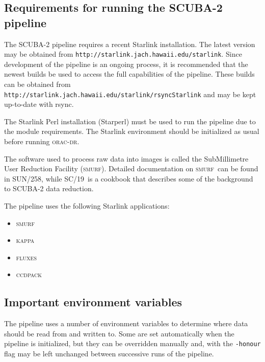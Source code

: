 \documentclass[twoside,11pt]{article}
\newcommand{\htmladdnormallink}[2]{#1}
\newcommand{\xref}[3]{#1}
\renewcommand{\_}{\texttt{\symbol{95}}}
\newcommand{\CCDPACK}{\textsc{ccdpack}}
\newcommand{\FLUXES}{\textsc{fluxes}}
\newcommand{\KAPPA}{\textsc{kappa}}
\newcommand{\SMURF}{\textsc{smurf}}
\newcommand{\SMURFcook}{\xref{SC/19}{sc19}{}}
\newcommand{\SMURFsun}{\xref{SUN/258}{sun258}{}}
\newcommand{\oracdr}{\textsc{orac-dr}}
\begin{document}
\subsection{Requirements for running the SCUBA-2 pipeline}

The SCUBA-2 pipeline requires a recent Starlink installation. The
latest version may be obtained from
\htmladdnormallink{\texttt{http://starlink.jach.hawaii.edu/starlink}}{http://starlink.jach.hawaii.edu/starlink}. Since
development of the pipeline is an ongoing process, it is recommended
that the newest builds be used to access the full capabilities of the
pipeline. These builds can be obtained from\\
\htmladdnormallink{\texttt{http://starlink.jach.hawaii.edu/starlink/rsyncStarlink}}{http://starlink.jach.hawaii.edu/starlink/rsyncStarlink}
and may be kept up-to-date with rsync.

The Starlink Perl installation (Starperl) must be used to run the
pipeline due to the module requirements. The Starlink environment should be
initialized as usual before running \oracdr.

The software used to process raw data into images is called the
SubMillimetre User Reduction Facility (\SMURF). Detailed documentation
on \SMURF\ can be found in \SMURFsun, while \SMURFcook\ is a cookbook
that describes some of the background to SCUBA-2 data reduction.

The pipeline uses the following Starlink applications:
\begin{itemize}
\item \SMURF
\item \KAPPA
\item \FLUXES
\item \CCDPACK
\end{itemize}

\subsection{Important environment variables}

The pipeline uses a number of environment variables to determine where
data should be read from and written to. Some are set automatically
when the pipeline is initialized, but they can be overridden manually
and, with the \verb+-honour+ flag may be left unchanged between
successive runs of the pipeline.
\end{document}
